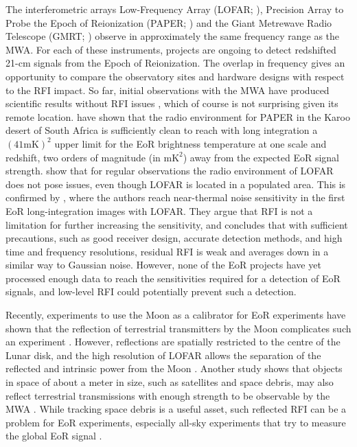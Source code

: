 \documentclass{pasa}
\begin{document}
The interferometric arrays Low-Frequency Array (LOFAR; \citealt{lofar-2013}), Precision Array to Probe the Epoch of Reionization (PAPER; \citealt{parsons-paper-eorlimit-2014}) and the Giant Metrewave Radio Telescope (GMRT; \citealt{the-gmrt-swarup-chapter-2013}) observe in approximately the same frequency range as the MWA. For each of these instruments, projects are ongoing to detect redshifted 21-cm signals from the Epoch of Reionization. The overlap in frequency gives an opportunity to compare the observatory sites and hardware designs with respect to the RFI impact. So far, initial observations with the MWA have produced scientific results without RFI issues \citep{hurley-walker-mwacs-2014, mckinley-fornaxa-2014, hindson-cluster-emission-2014}, which of course is not surprising given its remote location. \citet{parsons-paper-eorlimit-2014} have shown that the radio environment for PAPER in the Karoo desert of South Africa is sufficiently clean to reach with long integration a $(41 \textrm{mK})^2$ upper limit for the EoR brightness temperature at one scale and redshift, two orders of magnitude (in $\textrm{mK}^2$) away from the expected EoR signal strength. \citet{lofar-radio-environment} show that for regular observations the radio environment of LOFAR does not pose issues, even though LOFAR is located in a populated area. This is confirmed by \citet{ncp-eor-yatawatta}, where the authors reach near-thermal noise sensitivity in the first EoR long-integration images with LOFAR. They argue that RFI is not a limitation for further increasing the sensitivity, and \citet{offringa-rfi-distributions} concludes that with sufficient precautions, such as good receiver design, accurate detection methods, and high time and frequency resolutions, residual RFI is weak and averages down in a similar way to Gaussian noise. However, none of the EoR projects have yet processed enough data to reach the sensitivities required for a detection of EoR signals, and low-level RFI could potentially prevent such a detection.

Recently, experiments to use the Moon as a calibrator for EoR experiments have shown that the reflection of terrestrial transmitters by the Moon complicates such an experiment \citep{mckinley-moon-2013}. However, reflections are spatially restricted to the centre of the Lunar disk, and the high resolution of LOFAR allows the separation of the reflected and intrinsic power from the Moon \citep{vedantham-2014-todo}. Another study shows that objects in space of about a meter in size, such as satellites and space debris, may also reflect terrestrial transmissions with enough strength to be observable by the MWA \citep{tingay-space-debris-2013}. While tracking space debris is a useful asset, such reflected RFI can be a problem for EoR experiments, especially all-sky experiments that try to measure the global EoR signal \citep{vedantham-2014-todo}.
\end{document}

